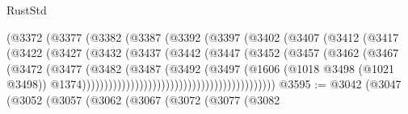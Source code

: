 \begin{lexlean}{RustStd}
\begin{coremodule}
                                      (@3372
                                        (@3377
                                          (@3382
                                            (@3387
                                              (@3392
                                                (@3397
                                                  (@3402
                                                    (@3407
                                                      (@3412
                                                        (@3417
                                                          (@3422
                                                            (@3427
                                                              (@3432
                                                                (@3437
                                                                  (@3442
                                                                    (@3447
                                                                      (@3452
                                                                        (@3457
                                                                          (@3462
                                                                            (@3467
                                                                              (@3472
                                                                                (@3477
                                                                                  (@3482
                                                                                    (@3487
                                                                                      (@3492
                                                                                        (@3497
                                                                                          (@1606
                                                                                            (@1018
                                                                                              @3498
                                                                                              (@1021
                                                                                                @3498))
                                                                                            @1374))))))))))))))))))))))))))))))))))))))))))))
@3595 := @3042
    (@3047
      (@3052
        (@3057
          (@3062
            (@3067
              (@3072
                (@3077
                  (@3082

\end{coremodule}
\end{lexlean}

